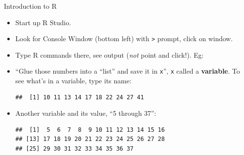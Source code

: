 \begin{frame}[fragile]{Introduction to R}
  
  \begin{itemize}
  \item Start up R Studio.
  \item Look for Console Window (bottom left) with \texttt{>} prompt,
    click on window.
  \item Type R commands there, see output (\emph{not} point and
    click!). Eg:



    
\begin{knitrout}
\color{fgcolor}\begin{kframe}
\begin{alltt}
\hlkwb{=}\hlstd{(}\hlstd{,}\hlstd{,}\hlstd{,}\hlstd{,}\hlstd{,}\hlstd{,}\hlstd{,}\hlstd{,}\hlstd{,}\hlstd{)}
\end{alltt}
\end{kframe}
\end{knitrout}
\item ``Glue those numbers into a ``list'' and save it in
  \texttt{x}'', \texttt{x} called a \textbf{variable}. To see what's
  in a variable, type its name:
  
  
 
\begin{knitrout}
\color{fgcolor}\begin{kframe}
\begin{alltt}
\end{alltt}
\begin{verbatim}
##  [1] 10 11 13 14 17 18 22 24 27 41
\end{verbatim}
\end{kframe}
\end{knitrout}

\item Another variable and its value, ``5 through 37'':

{\small  
 
\begin{knitrout}
\color{fgcolor}\begin{kframe}
\begin{alltt}
\hlkwb{=}\hlopt{:}
\end{alltt}
\begin{verbatim}
##  [1]  5  6  7  8  9 10 11 12 13 14 15 16
## [13] 17 18 19 20 21 22 23 24 25 26 27 28
## [25] 29 30 31 32 33 34 35 36 37
\end{verbatim}
\end{kframe}
\end{knitrout}
}  
  

  \end{itemize}
  
\end{frame}

